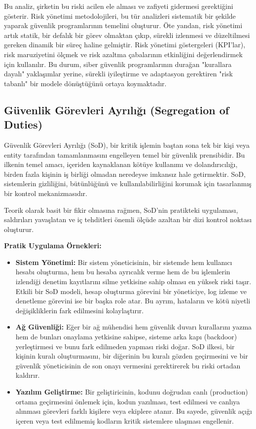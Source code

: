 Bu analiz, şirketin bu riski acilen ele alması ve zafiyeti gidermesi gerektiğini gösterir. Risk yönetimi metodolojileri, bu tür analizleri sistematik bir şekilde yaparak güvenlik programlarının temelini oluşturur. Öte yandan, risk yönetimi artık statik, bir defalık bir görev olmaktan çıkıp, sürekli izlenmesi ve düzeltilmesi gereken dinamik bir süreç haline gelmiştir. Risk yönetimi göstergeleri (KPI'lar), risk maruziyetini ölçmek ve risk azaltma çabalarının etkinliğini değerlendirmek için kullanılır. Bu durum, siber güvenlik programlarının durağan "kurallara dayalı" yaklaşımlar yerine, sürekli iyileştirme ve adaptasyon gerektiren "risk tabanlı" bir modele dönüştüğünü ortaya koymaktadır.

\subsection{Güvenlik Görevleri Ayrılığı (Segregation of Duties)}

Güvenlik Görevleri Ayrılığı (SoD), bir kritik işlemin baştan sona tek bir kişi veya entity tarafından tamamlanmasını engelleyen temel bir güvenlik prensibidir. Bu ilkenin temel amacı, içeriden kaynaklanan kötüye kullanımı ve dolandırıcılığı, birden fazla kişinin iş birliği olmadan neredeyse imkansız hale getirmektir. SoD, sistemlerin gizliliğini, bütünlüğünü ve kullanılabilirliğini korumak için tasarlanmış bir kontrol mekanizmasıdır.

Teorik olarak basit bir fikir olmasına rağmen, SoD'nin pratikteki uygulaması, saldırıları yavaşlatan ve iç tehditleri önemli ölçüde azaltan bir dizi kontrol noktası oluşturur.

\textbf{Pratik Uygulama Örnekleri:}

\begin{itemize}
    \item \textbf{Sistem Yönetimi:} Bir sistem yöneticisinin, bir sistemde hem kullanıcı hesabı oluşturma, hem bu hesaba ayrıcalık verme hem de bu işlemlerin izlendiği denetim kayıtlarını silme yetkisine sahip olması en yüksek riski taşır. Etkili bir SoD modeli, hesap oluşturma görevini bir yöneticiye, log izleme ve denetleme görevini ise bir başka role atar. Bu ayrım, hataların ve kötü niyetli değişikliklerin fark edilmesini kolaylaştırır.
    \item \textbf{Ağ Güvenliği:} Eğer bir ağ mühendisi hem güvenlik duvarı kurallarını yazma hem de bunları onaylama yetkisine sahipse, sisteme arka kapı (backdoor) yerleştirmesi ve bunu fark edilmeden yapması riski doğar. SoD ilkesi, bir kişinin kuralı oluşturmasını, bir diğerinin bu kuralı gözden geçirmesini ve bir güvenlik yöneticisinin de son onayı vermesini gerektirerek bu riski ortadan kaldırır.
    \item \textbf{Yazılım Geliştirme:} Bir geliştiricinin, kodunu doğrudan canlı (production) ortama geçirmesini önlemek için, kodun yazılması, test edilmesi ve canlıya alınması görevleri farklı kişilere veya ekiplere atanır. Bu sayede, güvenlik açığı içeren veya test edilmemiş kodların kritik sistemlere ulaşması engellenir.
\end{itemize}

